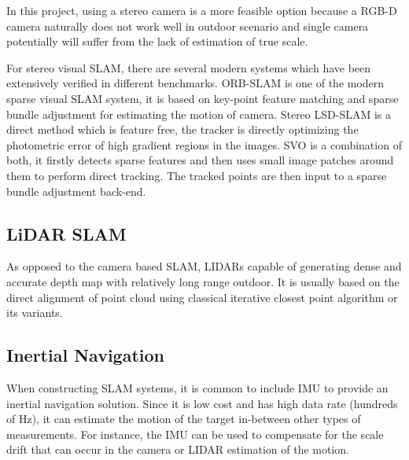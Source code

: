 In this project, using a stereo camera is a more feasible option 
because a RGB-D camera naturally does not work well in outdoor scenario
and single camera potentially will suffer from the lack of estimation
of true scale.

For stereo visual \gls{SLAM}, there are several modern systems
which have been extensively verified in different
benchmarks. \gls{ORB}-\gls{SLAM}\cite{DBLP:journals/corr/Mur-ArtalT16a} is one 
of the modern sparse visual \gls{SLAM}
system, it is based on key-point feature matching and sparse bundle
adjustment for estimating the motion of camera. Stereo LSD-SLAM\cite{7353631} is
a direct method which is feature free, the tracker is directly
optimizing the photometric error of  high gradient regions in the
images. SVO\cite{7782863} is a combination of both, it firstly detects sparse
features and then uses small image patches around them to perform
direct tracking. The tracked points are then input to a sparse bundle
adjustment back-end.

\subsection{LiDAR SLAM}

As opposed to the camera based \gls{SLAM}, \gls{LIDAR}s capable
of generating dense and accurate depth map with relatively long range
outdoor. It is usually based on the direct alignment of point cloud
using classical iterative closest point algorithm or its variants. 

\subsection{Inertial Navigation}

When constructing \gls{SLAM} systems, it is common to include \gls{IMU} to 
provide an inertial navigation solution. Since it is low
cost and has high data rate (hundreds of Hz), it can estimate the motion of the 
target in-between other types of measurements. For instance, the \gls{IMU} can 
be used to compensate for the scale drift that can occur in the camera or 
\gls{LIDAR} estimation of the motion. 




